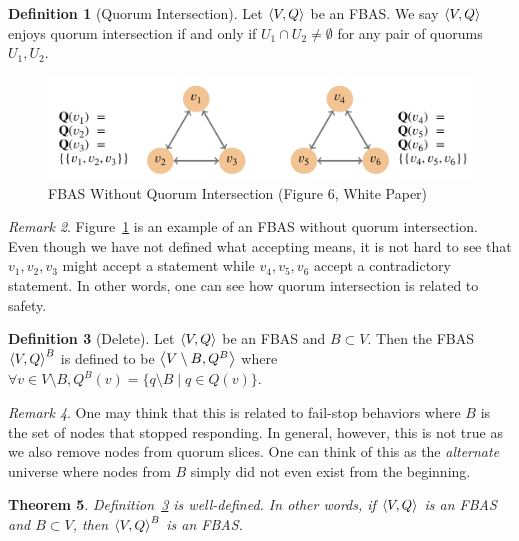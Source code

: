 \documentclass[12pt, psamsfonts]{amsart}
\newtheorem{thm}{Theorem}[subsection]
\theoremstyle{definition}
\newtheorem{defn}[thm]{Definition}
\theoremstyle{remark}
\newtheorem{rem}[thm]{Remark}
\numberwithin{equation}{subsection}
\begin{document}
\begin{defn}[Quorum Intersection]
    Let $\ev{V, Q}$ be an FBAS\@.
    We say $\ev{V, Q}$ enjoys quorum intersection if and only if $U_1 \cap U_2 \ne \emptyset$ for any pair of quorums $U_1, U_2$.
\end{defn}

\begin{figure}[!htb]
    \includegraphics[width=.7\linewidth]{img/quorum_intersection.jpeg}
    \caption{FBAS Without Quorum Intersection (Figure 6, White Paper)}
    \label{fig:fbas_without_quorum_intersection}
\end{figure}

\begin{rem}
    Figure~\ref{fig:fbas_without_quorum_intersection} is an example of an FBAS without quorum intersection.
    Even though we have not defined what accepting means, it is not hard to see that $v_1, v_2, v_3$ might accept a statement while $v_4, v_5, v_6$ accept a contradictory statement.
    In other words, one can see how quorum intersection is related to safety.
\end{rem}

\begin{defn}[Delete]\label{delete_fbas}
    Let $\ev{V, Q}$ be an FBAS and $B \subset V$.
    Then the FBAS $\ev{V, Q}^B$ is defined to be $\ev{V \setminus B, Q^B}$ where $\forall v \in V \setminus B, Q^B(v) = \{ q \setminus B \mid q \in Q(v) \}$.
\end{defn}

\begin{rem}
    One may think that this is related to fail-stop behaviors where $B$ is the set of nodes that stopped responding.
    In general, however, this is not true as we also remove nodes from quorum slices.
    One can think of this as the \textit{alternate} universe where nodes from $B$ simply did not even exist from the beginning.
\end{rem}

\begin{thm}
    Definition~\ref{delete_fbas} is well-defined.
    In other words, if $\ev{V, Q}$ is an FBAS and $B \subset V$, then $\ev{V, Q}^B$ is an FBAS\@.
\end{thm}
\end{document}

